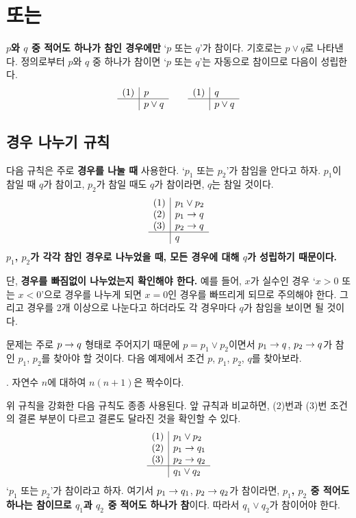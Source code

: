 \pagebreak

\section{또는}

\textbf{\(p\)와 \(q\) 중 적어도 하나가 참인 경우에만} `\(p\) 또는 \(q\)'가 참이다. 기호로는 \(p \vee q\)로 나타낸다. 정의로부터 \(p\)와 \(q\) 중 하나가 참이면 `\(p\) 또는 \(q\)'는 자동으로 참이므로 다음이 성립한다.
\[
    \begin{array}{c|l}
        (1) & p \\\hline & p \vee q
    \end{array}
    \qquad
    \begin{array}{c|l}
        (1) & q \\\hline & p \vee q
    \end{array}
\]

\subsection{경우 나누기 규칙}

다음 규칙은 주로 \textbf{경우를 나눌 때} 사용한다. `\(p_1\) 또는 \(p_2\)'가 참임을 안다고 하자. \(p_1\)이 참일 때 \(q\)가 참이고, \(p_2\)가 참일 때도 \(q\)가 참이라면, \(q\)는 참일 것이다.
\[
    \begin{array}{c|l}
        (1) & p_1 \vee p_2 \\ (2) & p_1 \rightarrow q \\ (3) & p_2 \rightarrow q \\\hline & q
    \end{array}
\]
\textbf{\(p_1\), \(p_2\)가 각각 참인 경우로 나누었을 때, 모든 경우에 대해 \(q\)가 성립하기 때문이다.}

단, \textbf{경우를 빠짐없이 나누었는지 확인해야 한다.} 예를 들어, \(x\)가 실수인 경우 `\(x > 0\) 또는 \(x < 0\)'으로 경우를 나누게 되면 \(x = 0\)인 경우를 빠뜨리게 되므로 주의해야 한다. 그리고 경우를 2개 이상으로 나눈다고 하더라도 각 경우마다 \(q\)가 참임을 보이면 될 것이다.

문제는 주로 \(p \rightarrow q\) 형태로 주어지기 때문에 \(p = p_1 \vee p_2\)이면서 \(p_1 \rightarrow q\), \(p_2 \rightarrow q\)가 참인 \(p_1\), \(p_2\)를 찾아야 할 것이다. 다음 예제에서 조건 \(p\), \(p_1\), \(p_2\), \(q\)를 찾아보라.

\bigskip

\ex. 자연수 \(n\)에 대하여 \(n(n + 1)\)은 짝수이다.

\pagebreak

위 규칙을 강화한 다음 규칙도 종종 사용된다. 앞 규칙과 비교하면, (2)번과 (3)번 조건의 결론 부분이 다르고 결론도 달라진 것을 확인할 수 있다.
\[
    \begin{array}{c|l}
        (1) & p_1 \vee p_2 \\ (2) & p_1 \rightarrow q_1 \\ (3) & p_2 \rightarrow q_2 \\\hline & q_1 \vee q_2
    \end{array}
\]
`\(p_1\) 또는 \(p_2\)'가 참이라고 하자. 여기서 \(p_1 \rightarrow q_1\), \(p_2 \rightarrow q_2\)가 참이라면, \textbf{\(p_1\), \(p_2\) 중 적어도 하나는 참이므로 \(q_1\)과 \(q_2\) 중 적어도 하나가 참}이다. 따라서 \(q_1 \vee q_2\)가 참이어야 한다.


